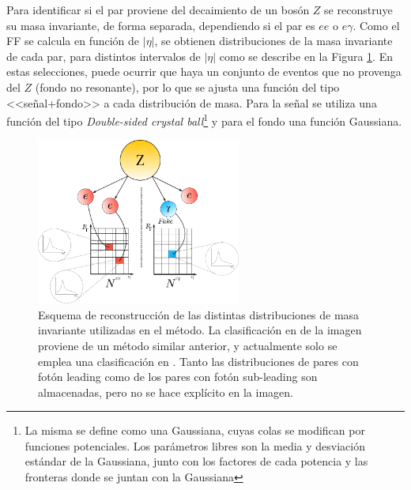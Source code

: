 Para identificar si el par proviene del decaimiento de un bosón $Z$ se reconstruye su masa invariante, de forma separada, dependiendo si el par es $ee$ o $e\gamma$. Como el FF se calcula en función de $|\eta|$, se obtienen distribuciones de la masa invariante de cada par, para distintos intervalos de $|\eta|$ como se describe en la Figura \ref{fig:efakes_matrix}. En estas selecciones, puede ocurrir que haya un conjunto de eventos que no provenga del $Z$ (fondo no resonante), por lo que se ajusta una función del tipo <<señal+fondo>> a cada distribución de masa. Para la señal se utiliza una función del tipo \textit{Double-sided crystal ball}\footnote{La misma se define como una Gaussiana, cuyas colas se modifican por funciones potenciales. Los parámetros libres son la media y desviación estándar de la Gaussiana, junto con los factores de cada potencia y las fronteras donde se juntan con la Gaussiana} \cite{Das:2016stf} y para el fondo una función Gaussiana.

\begin{figure}
  \centering
  \includegraphics[width=0.6\textwidth]{images/analysis/grid_en_2.pdf}
  \caption{Esquema de reconstrucción de las distintas distribuciones de masa invariante utilizadas en el método. La clasificación en \pt de la imagen proviene de un método similar anterior, y actualmente solo se emplea una clasificación en \absEta. Tanto las distribuciones de pares con fotón leading como de los pares con fotón sub-leading son almacenadas, pero no se hace explícito en la imagen.}
  \label{fig:efakes_matrix}
\end{figure}

